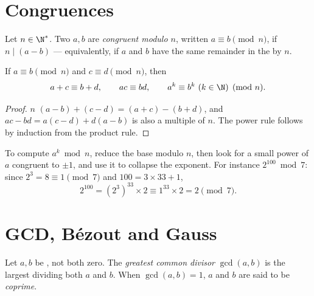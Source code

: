 \section{Congruences}

\begin{definition}[Congruence]\label{def:g12:arith:congruence}
Let $n \in \N^*$. Two  $a, b$ are \emph{congruent modulo
$n$}, written $a \equiv b \pmod n$, if $n \mid (a - b)$
--- equivalently, if $a$ and $b$ have the same remainder in the  by $n$.
\end{definition}

\begin{proposition}\label{prop:g12:arith:congops}
If $a \equiv b \pmod n$ and $c \equiv d \pmod n$, then
\[
a + c \equiv b + d, \qquad
ac \equiv bd, \qquad
a^k \equiv b^k \ (k \in \N) \pmod n .
\]
\end{proposition}

\begin{proof}
$n$  $(a-b) + (c-d) = (a+c) - (b+d)$, and
$ac - bd = a(c - d) + d(a - b)$ is also a multiple of $n$. The power rule
follows by induction from the product rule.
\end{proof}

\begin{method}\label{met:g12:arith:powers}
To compute $a^k \bmod n$, reduce the base modulo $n$, then look for a small
power of $a$ congruent to $\pm1$, and use it to collapse the exponent. For
instance $2^{100} \bmod 7$: since $2^3 = 8 \equiv 1 \pmod 7$ and
$100 = 3\times33 + 1$,
\[
2^{100} = \left(2^{3}\right)^{33} \times 2 \equiv 1^{33}\times 2 = 2 \pmod 7 .
\]
\end{method}

\section{GCD, Bézout and Gauss}

\begin{definition}[GCD]\label{def:g12:arith:gcd}
Let $a, b$ be , not both zero. The \emph{greatest common
divisor} $\gcd(a, b)$ is the largest  dividing both $a$
and $b$. When $\gcd(a,b) = 1$, $a$ and $b$ are said to be
\emph{coprime}.
\end{definition}

